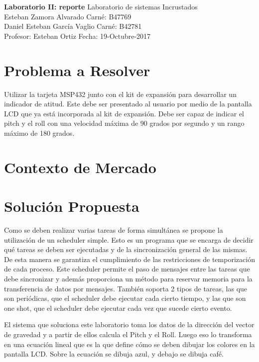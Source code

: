 

\noindent
\large\textbf{Laboratorio II: reporte} \hfill Laboratorio de sistemas Incrustados \\
\normalsize Esteban Zamora Alvarado \hfill Carné: B47769 \\
Daniel Esteban García Vaglio \hfill Carné: B42781 \\
Profesor: Esteban Ortiz  \hfill Fecha: 19-Octubre-2017 \\

\section{Problema a Resolver}

Utilizar la tarjeta MSP432 junto con el kit de expansión para desarrollar un indicador
de atitud. Este debe ser presentado al usuario por medio de la pantalla LCD que ya está incorporada
al kit de expansión. Debe ser capaz de indicar el pitch y el roll con una velocidad máxima de 90
grados por segundo y un rango máximo de 180 grados.  

\section{Contexto de Mercado}


\section{Solución Propuesta}

Como se deben realizar varias tareas de forma simultánea se propone la utilización de un scheduler
simple. Esto es un programa que se encarga de decidir qué tareas se deben ser ejecutadas y de la
sincronización general de las mismas. De esta manera se garantiza el cumplimiento de las
restricciones de temporización de cada proceso. Este scheduler permite el paso de mensajes entre las
tareas que debe sincronizar y además proporciona un método para reservar memoria para la
transferencia de datos por mensajes. También soporta 2 tipos de tareas, las que son periódicas, que
el scheduler debe ejecutar cada cierto tiempo, y las que son one shot, que el scheduler debe
ejecutar cada vez que sucede cierto evento.

El sistema que soluciona este laboratorio toma los datos de la dirección del vector de gravedad y a
partir de ellos calcula el Pitch y el Roll. Luego eso lo transforma en una ecuación lineal que es la
que define cómo se deben dibujar los colores en la pantalla LCD. Sobre la ecuación se dibuja azul, y
debajo se dibuja café. 

